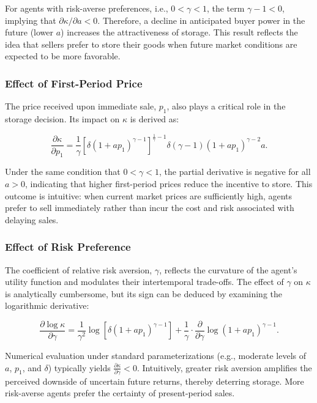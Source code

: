 For agents with risk-averse preferences, i.e., $0 < \gamma < 1$, the term $\gamma - 1 < 0$, implying that $\partial \kappa / \partial a < 0$. Therefore, a decline in anticipated buyer power in the future (lower $a$) increases the attractiveness of storage. This result reflects the idea that sellers prefer to store their goods when future market conditions are expected to be more favorable.

\subsubsection{Effect of First-Period Price}

\noindent The price received upon immediate sale, $p_1$, also plays a critical role in the storage decision. Its impact on $\kappa$ is derived as:

\begin{equation}
    \frac{\partial \kappa}{\partial p_1} = \frac{1}{\gamma} \left[ \delta (1+ap_1)^{\gamma-1} \right]^{\frac{1}{\gamma} - 1} \delta (\gamma-1) (1+ap_1)^{\gamma-2} a.
\end{equation}

Under the same condition that $0 < \gamma < 1$, the partial derivative is negative for all $a > 0$, indicating that higher first-period prices reduce the incentive to store. This outcome is intuitive: when current market prices are sufficiently high, agents prefer to sell immediately rather than incur the cost and risk associated with delaying sales.

\subsubsection{Effect of Risk Preference}

\noindent The coefficient of relative risk aversion, $\gamma$, reflects the curvature of the agent’s utility function and modulates their intertemporal trade-offs. The effect of $\gamma$ on $\kappa$ is analytically cumbersome, but its sign can be deduced by examining the logarithmic derivative:

\begin{equation}
    \frac{\partial \log \kappa}{\partial \gamma} = \frac{1}{\gamma^2} \log \left[ \delta (1+ap_1)^{\gamma-1} \right] + \frac{1}{\gamma} \cdot \frac{\partial}{\partial \gamma} \log (1+ap_1)^{\gamma - 1}.
\end{equation}

Numerical evaluation under standard parameterizations (e.g., moderate levels of $a$, $p_1$, and $\delta$) typically yields $\frac{\partial \kappa}{\partial \gamma} < 0$. Intuitively, greater risk aversion amplifies the perceived downside of uncertain future returns, thereby deterring storage. More risk-averse agents prefer the certainty of present-period sales.








